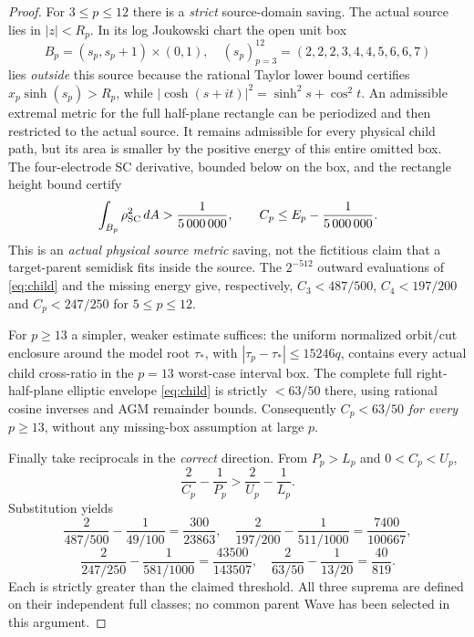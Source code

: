 \begin{proof}
For $3\le p\le12$
there is a \emph{strict}
source-domain saving.
The actual source lies in
$|z|<R_p$.  In its log
Joukowski chart the open
unit box
\[
 B_p=(s_p,s_p+1)\times(0,1),\quad
 (s_p)_{p=3}^{12}=
 (2,2,2,3,4,4,5,6,6,7)
\]
lies \emph{outside} this
source because the
rational Taylor lower
bound certifies
$x_p\sinh(s_p)>R_p$,
while
$|\cosh(s+it)|^2=
 \sinh^2s+\cos^2t$.
An admissible extremal
metric for the full
half-plane rectangle
can be periodized and
then restricted to the
actual source.  It remains
admissible for every
physical child path,
but its area is smaller
by the positive energy
of this entire omitted
box.  The four-electrode
SC derivative, bounded
below on the box, and
the rectangle height
bound certify
\[
 \int_{B_p}\rho_{\rm SC}^2\,dA>
 \frac1{5\,000\,000},\qquad
 C_p\le E_p-\frac1{5\,000\,000}.
\]
This is an \emph{actual
physical source metric}
saving, not the fictitious
claim that a target-parent
semidisk fits inside
the source.  The
$2^{-512}$ outward
evaluations of
\eqref{eq:child} and
the missing energy give,
respectively,
$C_3<487/500$,
$C_4<197/200$ and
$C_p<247/250$ for
$5\le p\le12$.

For $p\ge13$ a simpler,
weaker estimate suffices:
the uniform normalized
orbit/cut enclosure
around the model root
$\tau_*$, with
$|\tau_p-\tau_*|\le15246q$,
contains every actual
child cross-ratio in
the $p=13$ worst-case
interval box.
The complete full
right-half-plane
elliptic envelope
\eqref{eq:child} is
strictly $<63/50$
there, using rational
cosine inverses and
AGM remainder bounds.
Consequently $C_p<63/50$
\emph{for every} $p\ge13$,
without any missing-box
assumption at large $p$.

Finally take reciprocals
in the \emph{correct}
direction.  From $P_p>L_p$
and $0<C_p<U_p$,
\[
 \frac2{C_p}-\frac1{P_p}>
 \frac2{U_p}-\frac1{L_p}.
\]
Substitution yields
\[
 \frac2{487/500}-\frac1{49/100}
  =\frac{300}{23863},\quad
 \frac2{197/200}-\frac1{511/1000}
  =\frac{7400}{100667},
\]
\[
 \frac2{247/250}-\frac1{581/1000}
  =\frac{43500}{143507},\quad
 \frac2{63/50}-\frac1{13/20}=\frac{40}{819}.
\]
Each is strictly greater than the
claimed threshold.  All three
suprema are defined on their
independent full classes;
no common parent Wave has
been selected in this argument.
\end{proof}

